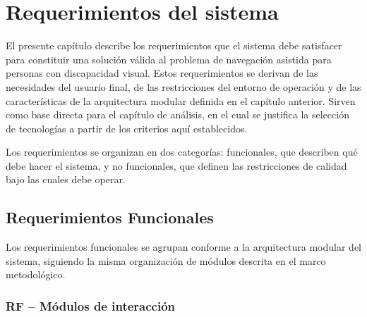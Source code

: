 \chapter{Requerimientos del sistema}

El presente capítulo describe los requerimientos que el sistema debe satisfacer para
constituir una solución válida al problema de navegación asistida para personas con
discapacidad visual. Estos requerimientos se derivan de las necesidades del usuario final,
de las restricciones del entorno de operación y de las características de la arquitectura
modular definida en el capítulo anterior. Sirven como base directa para el capítulo de
análisis, en el cual se justifica la selección de tecnologías a partir de los criterios
aquí establecidos.

Los requerimientos se organizan en dos categorías: funcionales, que describen qué debe
hacer el sistema, y no funcionales, que definen las restricciones de calidad bajo las
cuales debe operar.

\section{Requerimientos Funcionales}

Los requerimientos funcionales se agrupan conforme a la arquitectura modular del sistema,
siguiendo la misma organización de módulos descrita en el marco metodológico.

\subsection*{RF -- Módulos de interacción}

